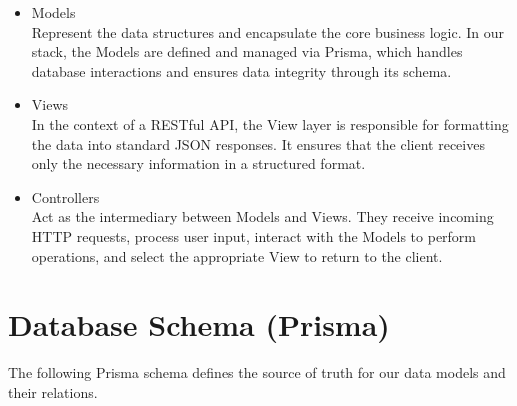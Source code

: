 \begin{itemize}
    \item Models \\
        Represent the data structures and encapsulate the core business logic. In our stack, the Models are defined and managed via Prisma, which handles database interactions and ensures data integrity through its schema.
    \item Views \\
        In the context of a RESTful API, the View layer is responsible for formatting the data into standard JSON responses. It ensures that the client receives only the necessary information in a structured format.
    \item Controllers \\
        Act as the intermediary between Models and Views. They receive incoming HTTP requests, process user input, interact with the Models to perform operations, and select the appropriate View to return to the client.
\end{itemize}

\section{Database Schema (Prisma)}
The following Prisma schema defines the source of truth for our data models and their relations.

